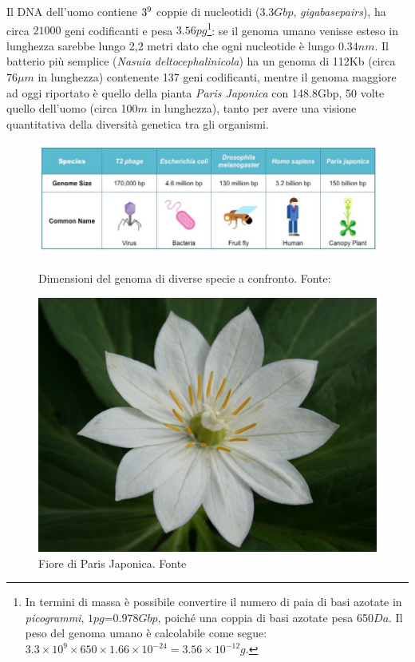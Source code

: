 \par Il DNA dell'uomo contiene $3\time10^{9}$ coppie di nucleotidi ($3.3Gbp$, \textit{gigabasepairs}), ha circa $21000$ geni codificanti e pesa $3.56pg$\footnote{In termini di massa è possibile convertire il numero di paia di basi azotate in \textit{picogrammi}, $1pg$=$0.978Gbp$, poiché una coppia di basi azotate pesa 650$Da$. Il peso del genoma umano è calcolabile come segue: $3.3\times10^{9}\times650\times1.66\times10^{-24}=3.56\times10^{-12}g$.}: se il genoma umano venisse esteso in lunghezza sarebbe lungo 2,2 metri dato che ogni nucleotide è lungo $0.34nm$. Il batterio più semplice (\textit{Nasuia deltocephalinicola}) ha un genoma di 112Kb\supercite{nasuiaWiki} (circa $76\mu m$ in lunghezza) contenente 137 geni codificanti, mentre il genoma maggiore ad oggi riportato è quello della pianta \textit{Paris Japonica} con 148.8Gbp\supercite{hidalgo2017there}, 50 volte quello dell'uomo (circa 100$m$ in lunghezza), tanto per avere una visione quantitativa della diversità genetica tra gli organismi.

\begin{figure}[!htb]
	\centering
	\includegraphics[scale=0.35]{images/genome-size-table_med.jpeg}
	\caption{Dimensioni del genoma di diverse specie a confronto. Fonte: \cite{genomeSizeBioNinja}}
	\label{fig:genome-size}
	\endminipage\hfill
	\centering
	\includegraphics[scale=0.1]{images/Paris-japonica.jpg}
	\caption{Fiore di Paris Japonica. Fonte \cite{Pariswiki}}
	\label{fig:paris-japonica}
	\endminipage\hfill
\end{figure}

